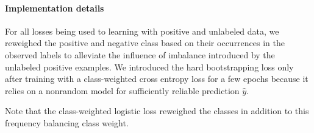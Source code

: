 \paragraph{Implementation details}
For all losses being used to learning with positive and unlabeled data, we reweighed the positive and negative class based on their occurrences in the observed labels to alleviate the influence of imbalance introduced by the unlabeled positive examples.
We introduced the hard bootstrapping loss only after training with a class-weighted cross entropy loss for a few epochs because it relies on a nonrandom model for sufficiently reliable prediction $\hat{y}$.




Note that the class-weighted logistic loss reweighed the classes in addition to this frequency balancing class weight.
